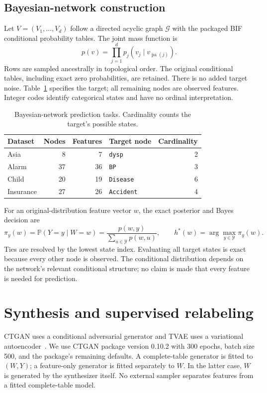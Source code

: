 \documentclass[11pt,letterpaper]{article}
\newcommand{\Prb}{\mathbb{P}}
\begin{document}
\subsection{Bayesian-network construction}
Let $V=(V_1,\ldots,V_d)$ follow a directed acyclic graph $\mathcal{G}$ with the packaged BIF conditional probability tables. The joint mass function is
\begin{equation}
 p(v)=\prod_{j=1}^{d}p_j(v_j\mid v_{\operatorname{pa}(j)}).
 \label{eq:bnjoint}
\end{equation}
Rows are sampled ancestrally in topological order. The original conditional tables, including exact zero probabilities, are retained. There is no added target noise. Table~\ref{tab:bntasks} specifies the target; all remaining nodes are observed features. Integer codes identify categorical states and have no ordinal interpretation.
\begin{table}[H]\centering
\caption{Bayesian-network prediction tasks. Cardinality counts the target's possible states.}\label{tab:bntasks}
\begin{tabular}{lrrlr}\toprule
Dataset & Nodes & Features & Target node & Cardinality\\\midrule
Asia & 8 & 7 & \texttt{dysp} & 2\\
Alarm & 37 & 36 & \texttt{BP} & 3\\
Child & 20 & 19 & \texttt{Disease} & 6\\
Insurance & 27 & 26 & \texttt{Accident} & 4\\\bottomrule
\end{tabular}
\end{table}
For an original-distribution feature vector $w$, the exact posterior and Bayes decision are
\begin{equation}
 \pi_y(w)=\Prb(Y=y\mid W=w)=\frac{p(w,y)}{\sum_{u\in\mathcal{Y}}p(w,u)},
 \qquad h^*(w)=\arg\max_{y\in\mathcal{Y}}\pi_y(w).
 \label{eq:bnposterior}
\end{equation}
Ties are resolved by the lowest state index. Evaluating all target states is exact because every other node is observed. The conditional distribution depends on the network's relevant conditional structure; no claim is made that every feature is needed for prediction.

\section{Synthesis and supervised relabeling}
CTGAN uses a conditional adversarial generator and TVAE uses a variational autoencoder~\cite{xu2019,ctganimplementation}. We use CTGAN package version 0.10.2 with 300 epochs, batch size 500, and the package's remaining defaults. A complete-table generator is fitted to $(W,Y)$; a feature-only generator is fitted separately to $W$. In the latter case, $W$ is generated by the synthesizer itself. No external sampler separates features from a fitted complete-table model.
\end{document}
